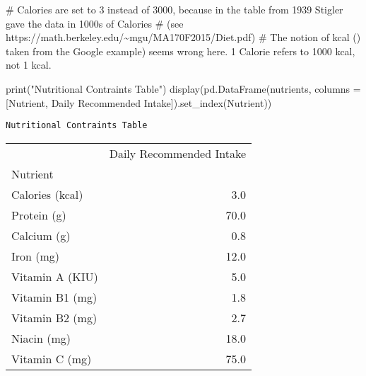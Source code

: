 \documentclass[
  ignorenonframetext,
]{beamer}
\newenvironment{Shaded}{\begin{snugshade}}{\end{snugshade}}
\newcommand{\BuiltInTok}[1]{\textcolor[rgb]{0.00,0.23,0.31}{#1}}
\newcommand{\CommentTok}[1]{\textcolor[rgb]{0.37,0.37,0.37}{#1}}
\newcommand{\NormalTok}[1]{\textcolor[rgb]{0.00,0.23,0.31}{#1}}
\newcommand{\OperatorTok}[1]{\textcolor[rgb]{0.37,0.37,0.37}{#1}}
\newcommand{\StringTok}[1]{\textcolor[rgb]{0.13,0.47,0.30}{#1}}
\begin{document}
\begin{frame}[fragile]
\begin{Shaded}
\begin{Highlighting}[]
\CommentTok{\# Calories are set to 3 instead of 3000, because in the table from 1939 Stigler gave the data in 1000s of Calories }
\CommentTok{\# (see https://math.berkeley.edu/\textasciitilde{}mgu/MA170F2015/Diet.pdf)}
\CommentTok{\# The notion of \textasciigrave{}kcal\textasciigrave{} () taken from the Google example) seems wrong here. 1 Calorie refers to 1000 kcal, not 1 kcal.}

\BuiltInTok{print}\NormalTok{(}\StringTok{"Nutritional Contraints Table"}\NormalTok{)}
\NormalTok{display(pd.DataFrame(nutrients, columns }\OperatorTok{=}\NormalTok{ [}\StringTok{\textquotesingle{}Nutrient\textquotesingle{}}\NormalTok{, }\StringTok{\textquotesingle{}Daily Recommended Intake\textquotesingle{}}\NormalTok{]).set\_index(}\StringTok{\textquotesingle{}Nutrient\textquotesingle{}}\NormalTok{))}
\end{Highlighting}
\end{Shaded}

\begin{verbatim}
Nutritional Contraints Table
\end{verbatim}

\begin{tabular}{lr}
\toprule
{} &  Daily Recommended Intake \\
Nutrient        &                           \\
\midrule
Calories (kcal) &                       3.0 \\
Protein (g)     &                      70.0 \\
Calcium (g)     &                       0.8 \\
Iron (mg)       &                      12.0 \\
Vitamin A (KIU) &                       5.0 \\
Vitamin B1 (mg) &                       1.8 \\
Vitamin B2 (mg) &                       2.7 \\
Niacin (mg)     &                      18.0 \\
Vitamin C (mg)  &                      75.0 \\
\bottomrule
\end{tabular}
\end{frame}
\end{document}
